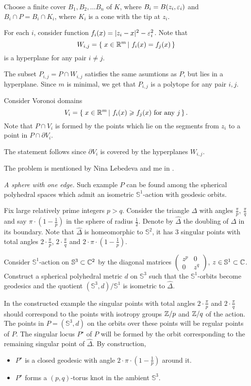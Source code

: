 Choose a finite cover $B_1,B_2,\dots B_n$ of $K$,
where $B_i=B(z_i,\varepsilon_i)$ 
and $B_i\cap P=B_i\cap K_i$, 
where $K_i$ is a cone with the tip at $z_i$.

For each $i$, consider function $f_i(x)=|z_i-x|^2-\varepsilon_i^2$.
Note that
\[W_{i,j}=\set{x\in\RR^m}{f_i(x)=f_j(x)}\]
is a hyperplane for any pair $i\ne j$.

The subset $P_{i,j}=P\cap W_{i,j}$ satisfies the same asumtions as $P$, but lies in a hyperplane.
Since $m$ is minimal, we get that $P_{i,j}$ is a polytope for any pair $i,j$.

Consider Voronoi domains 
\[V_{i}=\set{x\in\RR^m}{f_i(x)\ge f_j(x) \ \text{for any}\ j}.\]
Note that $P\cap V_i$ is formed by the points which lie on the segments from $z_i$ to a point in  $P\cap \partial V_i$.

The statement follows since $\partial V_i$ is covered by the hyperplanes $W_{i,j}$.

The problem is mentioned by Nina Lebedeva and me in \cite{lebedeva-petrunin}.

\textit{A sphere with one edge.}
Such example $P$ can be found among the spherical polyhedral spaces which admit
an isometric $\mathbb{S}^1$-action with geodesic orbits.

Fix large relatively prime integers $p>q$. 
Consider the triangle $\Delta$ with angles $\tfrac\pi p$, $\tfrac\pi q$ and say $\pi\cdot(1-\tfrac1 p)$ in the sphere of radius $\tfrac12$.
Denote by $\hat \Delta$ the  doubling of $\Delta$ in its boundary.
Note that $\hat \Delta$ is homeomorphic to $\mathbb S^2$,
it has 3 singular points with total angles $2\cdot\tfrac\pi p$,
$2\cdot\tfrac\pi q$ and $2\cdot\pi\cdot(1-\tfrac1 p)$.

Consider $\mathbb S^1$-action on $\mathbb S^3\subset\mathbb{C}^2$ by the diagonal matrices $\left(\begin{smallmatrix}z^p&0\\0&z^q\end{smallmatrix}\right)$, $z\in\mathbb S^1\subset\mathbb{C}$.
Construct a spherical polyhedral metric $d$ on  $\mathbb S^3$
such that the $\mathbb S^1$-orbits become geodesics 
and the quotient $(\mathbb S^3,d)/\mathbb S^1$
is isometric to $\hat \Delta$.

In the constructed example 
the singular points with total angles $2\cdot\tfrac\pi p$ and
$2\cdot\tfrac\pi q$
should correspond to the points with isotropy groups $\mathbb{Z}/p$ and $\mathbb{Z}/q$ of the action.
The points in $P=(\mathbb{S}^3,d)$ on the orbits over these points will be regular points of $P$.
The singular locus $P^\star$
of $P$ will be formed by the orbit corresponding to the remaining singular point of  $\hat \Delta$.
By construction,
\begin{itemize}
\item $P^\star$ is a closed geodesic with angle $2\cdot\pi\cdot(1-\tfrac1p)$ around it.
\item $P^\star$ forms a $(p,q)$-torus knot in the ambient $\mathbb{S}^3$.
\end{itemize}


